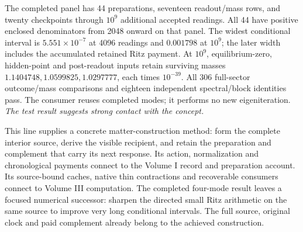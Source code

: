 The completed panel has 44 preparations, seventeen readout/mass rows,
and twenty checkpoints through \(10^9\) additional accepted readings.
All 44 have positive enclosed denominators from 2048 onward on that
panel. The widest conditional interval is \(5.551\times10^{-7}\) at
4096 readings and \(0.001798\) at \(10^9\); the later width includes
the accumulated retained Ritz payment. At \(10^9\), equilibrium-zero,
hidden-point and post-readout inputs retain surviving masses
\(1.1404748,1.0599825,1.0297777\), each times \(10^{-39}\).
All 306 full-sector outcome/mass comparisons and eighteen independent
spectral/block identities pass. The consumer reuses completed modes;
it performs no new eigeniteration. \emph{The test result suggests
strong contact with the concept.}

This line supplies a concrete matter-construction method: form the
complete interior source, derive the visible recipient, and retain
the preparation and complement that carry its next response.
Its action, normalization and chronological payments connect to the
Volume I record and preparation account. Its source-bound caches,
native thin contractions and recoverable consumers connect to
Volume III computation. The completed four-mode result leaves a
focused numerical successor: sharpen the directed small Ritz
arithmetic on the same source to improve very long conditional
intervals. The full source, original clock and paid complement
already belong to the achieved construction.
